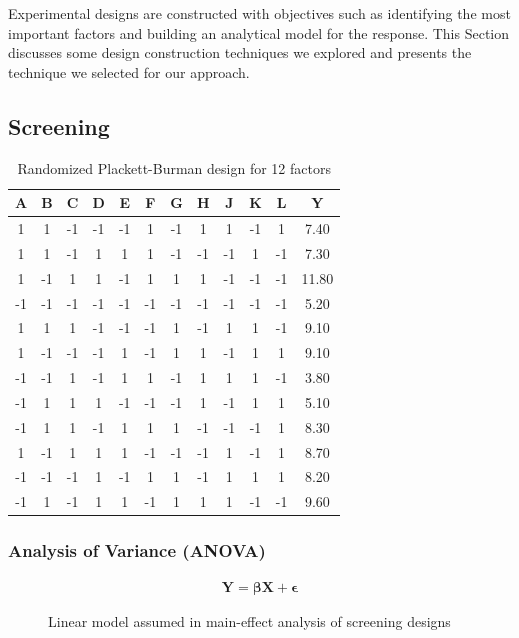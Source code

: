 \documentclass[conference]{IEEEtran}
\begin{document}
Experimental designs are constructed with objectives such as identifying the
most important factors and building an analytical model for the response. This
Section discusses some design construction techniques we explored and presents
the technique we selected for our approach.
\subsection{Screening}
\label{sec:org20804b7}
\begin{table}[ht]
\centering
\caption{Randomized Plackett-Burman design for 12 factors}
\begingroup\small
\begin{tabular}{cccccccccccc}
  \toprule
A & B & C & D & E & F & G & H & J & K & L & Y \\
  \midrule
1 & 1 & -1 & -1 & -1 & 1 & -1 & 1 & 1 & -1 & 1 & 7.40 \\
  1 & 1 & -1 & 1 & 1 & 1 & -1 & -1 & -1 & 1 & -1 & 7.30 \\
  1 & -1 & 1 & 1 & -1 & 1 & 1 & 1 & -1 & -1 & -1 & 11.80 \\
  -1 & -1 & -1 & -1 & -1 & -1 & -1 & -1 & -1 & -1 & -1 & 5.20 \\
  1 & 1 & 1 & -1 & -1 & -1 & 1 & -1 & 1 & 1 & -1 & 9.10 \\
  1 & -1 & -1 & -1 & 1 & -1 & 1 & 1 & -1 & 1 & 1 & 9.10 \\
  -1 & -1 & 1 & -1 & 1 & 1 & -1 & 1 & 1 & 1 & -1 & 3.80 \\
  -1 & 1 & 1 & 1 & -1 & -1 & -1 & 1 & -1 & 1 & 1 & 5.10 \\
  -1 & 1 & 1 & -1 & 1 & 1 & 1 & -1 & -1 & -1 & 1 & 8.30 \\
  1 & -1 & 1 & 1 & 1 & -1 & -1 & -1 & 1 & -1 & 1 & 8.70 \\
  -1 & -1 & -1 & 1 & -1 & 1 & 1 & -1 & 1 & 1 & 1 & 8.20 \\
  -1 & 1 & -1 & 1 & 1 & -1 & 1 & 1 & 1 & -1 & -1 & 9.60 \\
   \bottomrule
\end{tabular}
\endgroup
\end{table}

\subsubsection{Analysis of Variance (ANOVA)}
\label{sec:org6e0fece}
\begin{figure}
{\normalsize
\begin{align*}
\mathbf{Y} = \bm{\beta}\mathbf{X} + \bm{\epsilon}
\end{align*}
}
\caption{Linear model assumed in main-effect analysis of screening designs}
\end{figure}
\end{document}
